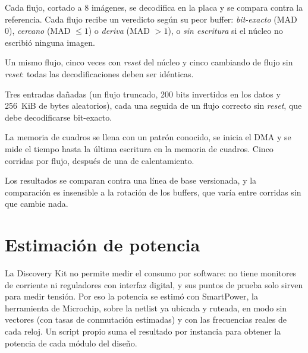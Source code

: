 \begin{description}[style=nextline, leftmargin=1.5em]
  \item[Conformidad] Cada flujo, cortado a 8 imágenes, se decodifica en la
    placa y se compara contra la referencia. Cada flujo recibe un veredicto
    según su peor buffer: \emph{bit-exacto} (MAD 0), \emph{cercano}
    (MAD $\leq 1$) o \emph{deriva} (MAD $> 1$), o \emph{sin escritura} si
    el núcleo no escribió ninguna imagen.
  \item[Determinismo] Un mismo flujo, cinco veces con \emph{reset} del
    núcleo y cinco cambiando de flujo sin \emph{reset}: todas las
    decodificaciones deben ser idénticas.
  \item[Robustez] Tres entradas dañadas (un flujo truncado, 200 bits
    invertidos en los datos y 256~KiB de bytes aleatorios), cada una seguida
    de un flujo correcto sin \emph{reset}, que debe decodificarse bit-exacto.
  \item[Velocidad] La memoria de cuadros se llena con un patrón conocido, se
    inicia el DMA y se mide el tiempo hasta la última escritura en la
    memoria de cuadros. Cinco corridas por flujo, después de una de
    calentamiento.
\end{description}

Los resultados se comparan contra una línea de base versionada, y la
comparación es insensible a la rotación de los buffers, que varía entre
corridas sin que cambie nada.

\section{Estimación de potencia}
\label{sec:modelo-potencia}

La Discovery Kit no permite medir el consumo por software: no tiene monitores
de corriente ni reguladores con interfaz digital, y sus puntos de prueba solo
sirven para medir tensión. Por eso la potencia se estimó con SmartPower, la
herramienta de Microchip, sobre la netlist ya ubicada y ruteada, en modo sin
vectores (con tasas de conmutación estimadas) y con las frecuencias reales
de cada reloj. Un script propio suma el resultado por instancia para obtener
la potencia de cada módulo del diseño.
